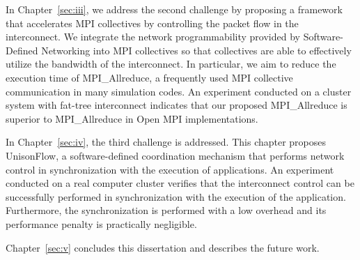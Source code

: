 In Chapter~\ref{sec:iii}, we address the second challenge by proposing a
framework that accelerates MPI collectives by controlling the packet flow in
the interconnect. We integrate the network programmability provided by
Software-Defined Networking into MPI collectives so that collectives are able
to effectively utilize the bandwidth of the interconnect. In particular, we
aim to reduce the execution time of MPI\_Allreduce, a frequently used MPI
collective communication in many simulation codes. An experiment conducted on
a cluster system with fat-tree interconnect indicates that our proposed
MPI\_Allreduce is superior to MPI\_Allreduce in Open MPI implementations.

In Chapter~\ref{sec:iv}, the third challenge is addressed. This chapter
proposes UnisonFlow, a software-defined coordination mechanism that performs
network control in synchronization with the execution of applications. An
experiment conducted on a real computer cluster verifies that the interconnect
control can be successfully performed in synchronization with the execution of
the application. Furthermore, the synchronization is performed with a low
overhead and its performance penalty is practically negligible.

Chapter~\ref{sec:v} concludes this dissertation and describes the future work.
